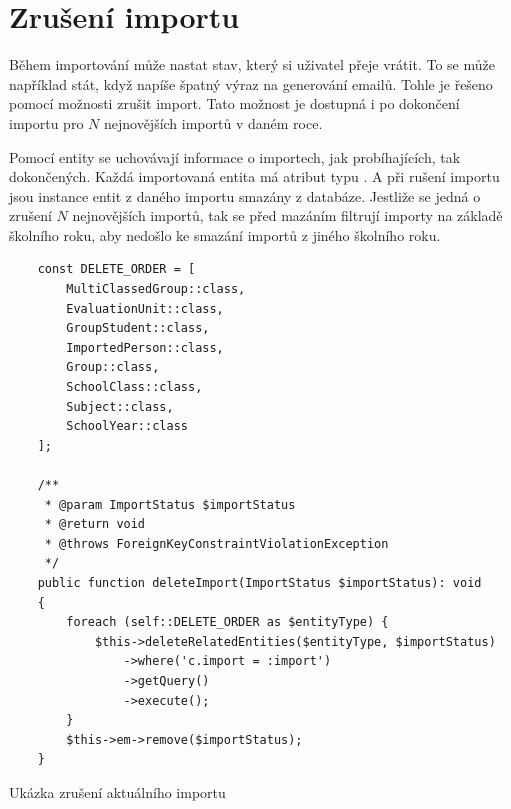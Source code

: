 \section{Zrušení importu}\label{postup:zruseni-importu}

Během importování může nastat stav, který si uživatel přeje vrátit.
To se může například stát, když napíše špatný výraz na generování emailů.
Tohle je řešeno pomocí možnosti zrušit import.
Tato možnost je dostupná i po dokončení importu pro $N$ nejnovějších importů v daném roce.

Pomocí entity  se uchovávají informace o importech, jak probíhajících, tak dokončených.
Každá importovaná entita má atribut  typu .
A při rušení importu jsou instance entit z daného importu smazány z databáze.
Jestliže se jedná o zrušení $N$ nejnovějších importů, tak se před mazáním filtrují importy na základě školního roku, aby nedošlo ke smazání importů z jiného školního roku.


\begin{code}[H]

  \begin{verbatim}
    const DELETE_ORDER = [
        MultiClassedGroup::class,
        EvaluationUnit::class,
        GroupStudent::class,
        ImportedPerson::class,
        Group::class,
        SchoolClass::class,
        Subject::class,
        SchoolYear::class
    ];

    /**
     * @param ImportStatus $importStatus
     * @return void
     * @throws ForeignKeyConstraintViolationException
     */
    public function deleteImport(ImportStatus $importStatus): void
    {
        foreach (self::DELETE_ORDER as $entityType) {
            $this->deleteRelatedEntities($entityType, $importStatus)
                ->where('c.import = :import')
                ->getQuery()
                ->execute();
        }
        $this->em->remove($importStatus);
    }
  \end{verbatim}
  
  \caption{Ukázka zrušení aktuálního importu}

\end{code}
